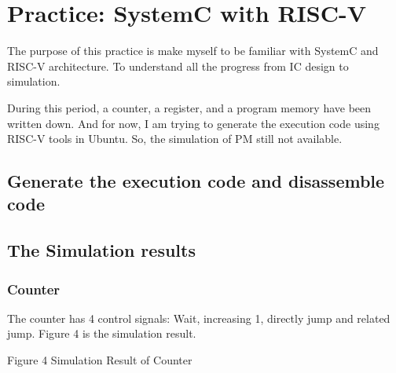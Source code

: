 \chapter{Practice: SystemC with RISC-V}
\par The purpose of this practice is make myself to be familiar with SystemC and RISC-V architecture. To understand all the progress from IC design to simulation.
\par During this period, a counter, a register, and a program memory have been written down. And for now, I am trying to generate the execution code using RISC-V tools in Ubuntu. So, the simulation of PM still not available.
\section{Generate the execution code and disassemble code}

\section{The Simulation results}
\subsection{Counter}
\par The counter has 4 control signals: Wait, increasing 1, directly jump and related jump. Figure 4 is the simulation result. 
 
Figure 4 Simulation Result of Counter
